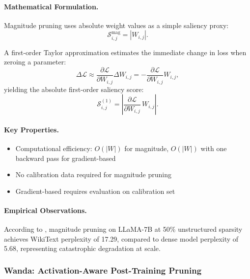 \paragraph{Mathematical Formulation.}
Magnitude pruning uses absolute weight values as a simple saliency proxy:
\begin{equation}
	\mathcal{S}^{\mathrm{mag}}_{i,j} = |W_{i,j}|.
\end{equation}

A first-order Taylor approximation estimates the immediate change in loss when zeroing a parameter:
\begin{equation}
	\Delta\mathcal{L} \approx \frac{\partial\mathcal{L}}{\partial W_{i,j}} \Delta W_{i,j}
	= -\frac{\partial\mathcal{L}}{\partial W_{i,j}} W_{i,j},
\end{equation}
yielding the absolute first-order saliency score:
\begin{equation}
	\mathcal{S}^{(1)}_{i,j} = \left|\frac{\partial\mathcal{L}}{\partial W_{i,j}}\,W_{i,j}\right|.
	\label{eq:first-order-saliency}
\end{equation}

\paragraph{Key Properties.}
\begin{itemize}[nosep]
	\item Computational efficiency: $O(|W|)$ for magnitude, $O(|W|)$ with one backward pass for gradient-based
	\item No calibration data required for magnitude pruning
	\item Gradient-based requires evaluation on calibration set
\end{itemize}

\paragraph{Empirical Observations.} According to \cite{sun2023simple}, magnitude pruning on LLaMA-7B at 50\% unstructured sparsity achieves WikiText perplexity of 17.29, compared to dense model perplexity of 5.68, representing catastrophic degradation at scale.

\subsubsection{Wanda: Activation-Aware Post-Training Pruning \cite{sun2023simple}}

